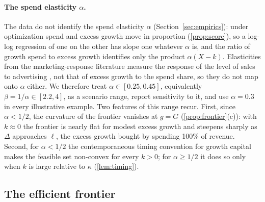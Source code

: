 \paragraph{The spend elasticity $\alpha$.} The data do not identify the spend elasticity $\alpha$ (Section~\ref{sec:empirics}): under optimization spend and excess growth move in proportion (\autoref{prop:score}), so a log-log regression of one on the other has slope one whatever $\alpha$ is, and the ratio of growth spend to excess growth identifies only the product $\alpha(X-k)$. Elasticities from the marketing-response literature measure the response of the level of sales to advertising \citep{sethuraman2011advertising}, not that of excess growth to the spend share, so they do not map onto $\alpha$ either. We therefore treat $\alpha\in[0.25,0.45]$, equivalently $\beta=1/\alpha\in[2.2,4]$, as a scenario range, report sensitivity to it, and use $\alpha=0.3$ in every illustrative example. Two features of this range recur. First, since $\alpha<1/2$, the curvature of the frontier vanishes at $g=G$ (\autoref{prop:frontier}(c)): with $k\approx 0$ the frontier is nearly flat for modest excess growth and steepens sharply as $\Delta$ approaches $\ell$, the excess growth bought by spending 100\% of revenue. Second, for $\alpha<1/2$ the contemporaneous timing convention for growth capital makes the feasible set non-convex for every $k>0$; for $\alpha\ge1/2$ it does so only when $k$ is large relative to $\kappa$ (\autoref{lem:timing}).

\subsection{The efficient frontier}\label{sec:model-frontier}


